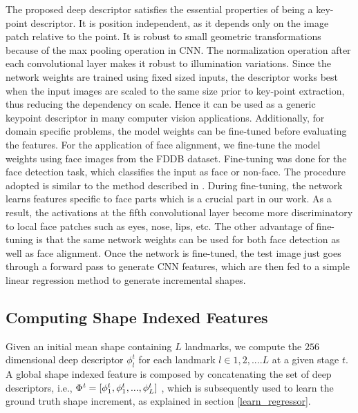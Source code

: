 \documentclass[10pt,twocolumn,letterpaper]{article}
\begin{document}
The proposed deep descriptor satisfies the essential properties of being a key-point descriptor. It is position independent, as it depends only on the image patch relative to the point. It is robust to small geometric transformations because of the max pooling operation in CNN. The normalization operation after each convolutional layer makes it robust to illumination variations. Since the network weights are trained using fixed sized inputs, the descriptor works best when the input images are scaled to the same size prior to key-point extraction, thus reducing the dependency on scale. Hence it can be used as a generic keypoint descriptor in many computer vision applications. Additionally, for domain specific problems, the model weights can be fine-tuned before evaluating the features. For the application of face alignment, we fine-tune the model weights using face images from the FDDB \cite{fddbTech} dataset. Fine-tuning was done for the face detection task, which classifies the input as face or non-face. The procedure adopted is similar to the method described in \cite{girshick14CVPR}. During fine-tuning, the network learns features specific to face parts which is a crucial part in our work. As a result, the activations at the fifth convolutional layer become more discriminatory to local face patches such as eyes, nose, lips, etc. The other advantage of fine-tuning is that the same network weights can be used for both face detection as well as face alignment. Once the network is fine-tuned, the test image just goes through a forward pass to generate CNN features, which are then fed to a simple linear regression method to generate incremental shapes. 



\subsection{Computing Shape Indexed Features}

Given an initial mean shape containing $L$ landmarks, we compute the $256$ dimensional deep descriptor $\phi_l^t$ for each landmark $l \in {1,2,....L}$ at a given stage $t$. A global shape indexed feature is composed by concatenating the set of deep descriptors, i.e., $\Phi{\textsuperscript{\textit{t}}}=[\phi_1^t,\phi_1^t,...,\phi_L^t]$ , which is subsequently used to learn the ground truth shape increment, as explained in section \ref{learn_regressor}.
\end{document}
